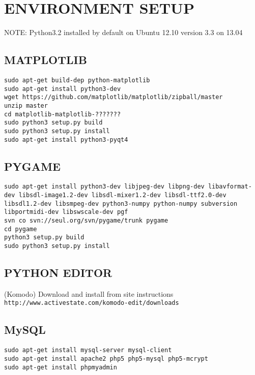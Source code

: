 \chapter{ENVIRONMENT SETUP}\label{app}

NOTE: Python3.2 installed by default on Ubuntu 12.10 version 3.3 on 13.04

\section{MATPLOTLIB}

\texttt{sudo apt-get build-dep python-matplotlib}\\
\texttt{sudo apt-get install python3-dev}\\
\texttt{wget https://github.com/matplotlib/matplotlib/zipball/master}\\
\texttt{unzip master}\\
\texttt{cd matplotlib-matplotlib-???????} \\
\texttt{sudo python3 setup.py build}\\
\texttt{sudo python3 setup.py install}\\
\texttt{sudo apt-get install python3-pyqt4}

\section{PYGAME}

\texttt{sudo apt-get install python3-dev libjpeg-dev libpng-dev libavformat-dev libsdl-image1.2-dev libsdl-mixer1.2-dev libsdl-ttf2.0-dev libsdl1.2-dev libsmpeg-dev python3-numpy python-numpy subversion libportmidi-dev libswscale-dev pgf}\\
\texttt{svn co svn://seul.org/svn/pygame/trunk pygame}\\
\texttt{cd pygame}\\
\texttt{python3 setup.py build}\\
\texttt{sudo python3 setup.py install}\\

\section{PYTHON EDITOR}

(Komodo) Download and install from site instructions\\

\texttt{http://www.activestate.com/komodo-edit/downloads}\\

\section{MySQL}

\texttt{sudo apt-get install mysql-server mysql-client}\\
\texttt{sudo apt-get install apache2 php5 php5-mysql php5-mcrypt}\\
\texttt{sudo apt-get install phpmyadmin}\\

